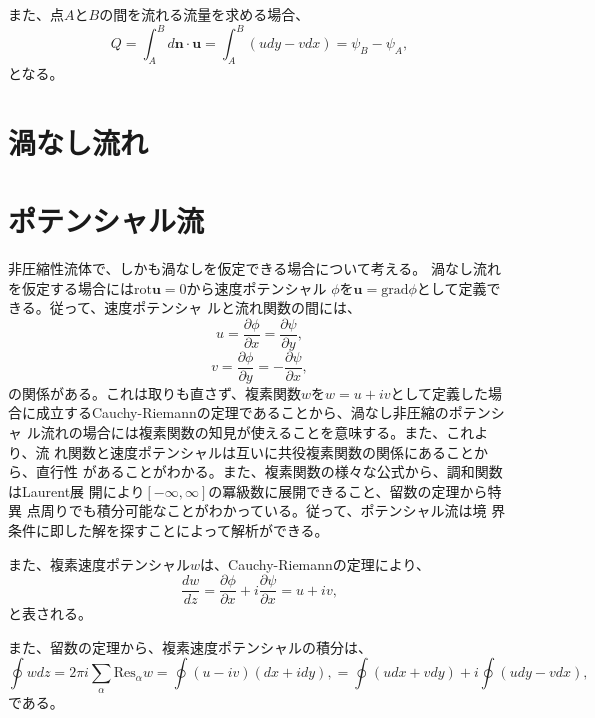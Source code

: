 また、点$A$と$B$の間を流れる流量を求める場合、
\begin{equation}
 Q = \int_{A}^{B}d\bm{n}\cdot\bm{u} 
  = \int_{A}^{B} (udy - vdx)
  = \psi_B - \psi_A,
\end{equation}
となる。

\section{渦なし流れ}



\section{ポテンシャル流}
非圧縮性流体で、しかも渦なしを仮定できる場合について考える。
渦なし流れを仮定する場合には$\text{rot}\bm{u}=0$から速度ポテンシャル
$\phi$を$\bm{u}=\text{grad}\phi$として定義できる。従って、速度ポテンシャ
ルと流れ関数の間には、
\begin{equation}
 u = \frac{\partial \phi}{\partial x} 
  = \frac{\partial \psi}{\partial y},
\end{equation}
\begin{equation}
 v = \frac{\partial \phi}{\partial y}
  = -\frac{\partial \psi}{\partial x},
\end{equation}
の関係がある。これは取りも直さず、複素関数$w$を$w=u+iv$として定義した場
合に成立するCauchy-Riemannの定理であることから、渦なし非圧縮のポテンシャ
ル流れの場合には複素関数の知見が使えることを意味する。また、これより、流
れ関数と速度ポテンシャルは互いに共役複素関数の関係にあることから、直行性
があることがわかる。また、複素関数の様々な公式から、調和関数はLaurent展
開により$[-\infty, \infty]$の冪級数に展開できること、留数の定理から特異
点周りでも積分可能なことがわかっている。従って、ポテンシャル流は境
界条件に即した解を探すことによって解析ができる。

また、複素速度ポテンシャル$w$は、Cauchy-Riemannの定理により、
\begin{equation}
 \frac{dw}{dz} = 
  \frac{\partial \phi}{\partial x}
  + i\frac{\partial \psi}{\partial x}
  = u + iv,
\end{equation}
と表される。

また、留数の定理から、複素速度ポテンシャルの積分は、
\begin{equation}
 \oint wdz = 2\pi i\sum_{\alpha} \text{Res}_{\alpha} w
  = \oint (u-iv)(dx + idy),
  = \oint (udx +vdy) + i\oint (udy - vdx),
\end{equation}
である。

